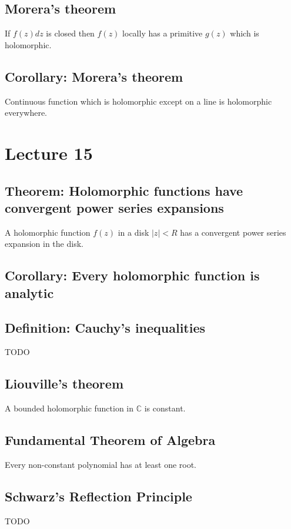 \documentclass[11pt]{article}
\newcommand{\C}{\mathbb{C}}
\begin{document}
\subsection{Morera's theorem}
If $f(z)dz$ is closed then $f(z)$ locally has a primitive $g(z)$ which is holomorphic. 

\subsection{Corollary: Morera's theorem} 
Continuous function which is holomorphic except on a line is holomorphic everywhere. 


\section{Lecture 15}

\subsection{Theorem: Holomorphic functions have convergent power series expansions}
A holomorphic function $f(z)$ in a disk $|z| < R$ has a convergent power series expansion in the disk. 

\subsection{Corollary: Every holomorphic function is analytic}

\subsection{Definition: Cauchy's inequalities}
TODO

\subsection{Liouville's theorem}
A bounded holomorphic function in $\C$ is constant. 

\subsection{Fundamental Theorem of Algebra}
Every non-constant polynomial has at least one root. 

\subsection{Schwarz's Reflection Principle}
TODO 
\end{document}

